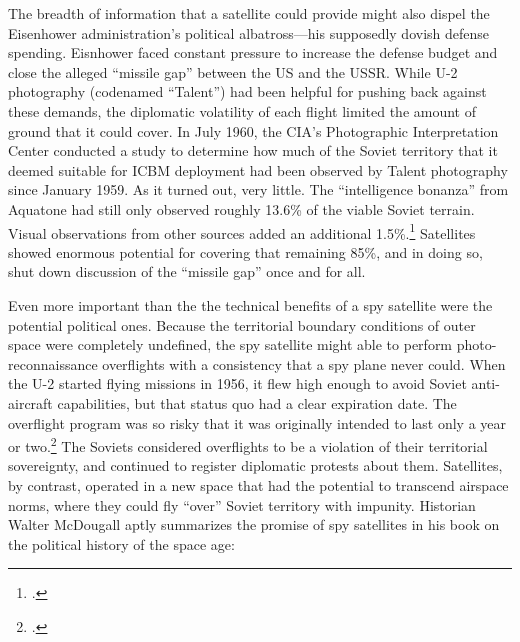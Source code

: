 \documentclass{memoir}
\begin{document}
The breadth of information that a satellite could provide might also dispel the Eisenhower administration's political albatross---his supposedly dovish defense spending. Eisnhower faced constant pressure to increase the defense budget and close the alleged ``missile gap'' between the US and the USSR. While U-2 photography (codenamed ``Talent'') had been helpful for pushing back against these demands, the diplomatic volatility of each flight limited the amount of ground that it could cover. In July 1960, the CIA's Photographic Interpretation Center conducted a study to determine how much of the Soviet territory that it deemed suitable for ICBM deployment had been observed by Talent photography since January 1959. As it turned out, very little. The ``intelligence bonanza'' from Aquatone had still only observed roughly 13.6\% of the viable Soviet terrain. Visual observations from other sources added an additional 1.5\%.\footcite[A significant portion of this document is redacted, including, for some reason, the page numbers.]{cia_future_1960} Satellites showed enormous potential for covering that remaining 85\%, and in doing so, shut down discussion of the ``missile gap'' once and for all.

Even more important than the the technical benefits of a spy satellite were the potential political ones. Because the territorial boundary conditions of outer space were completely undefined, the spy satellite might able to perform photo-reconnaissance overflights with a consistency that a spy plane never could. When the U-2 started flying missions in 1956, it flew high enough to avoid Soviet anti-aircraft capabilities, but that status quo had a clear expiration date. The overflight program was so risky that it was originally intended to last only a year or two.\footcite[p.~33]{lindgren_trust_2000} The Soviets considered overflights to be a violation of their territorial sovereignty, and continued to register diplomatic protests about them. Satellites, by contrast, operated in a new space that had the potential to transcend airspace norms, where they could fly ``over'' Soviet territory with impunity. Historian Walter McDougall aptly summarizes the promise of spy satellites in his book on the political history of the space age:
\end{document}
